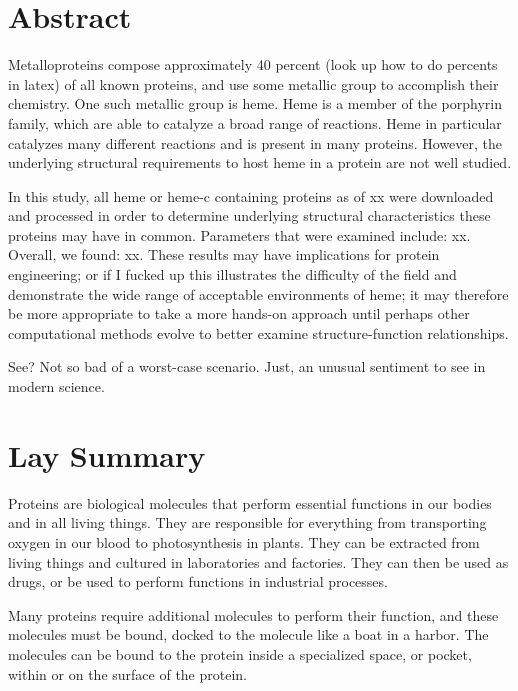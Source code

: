 \documentclass[12pt,oneside,a4paper]{report}
\begin{document}
	
	
	\chapter*{Abstract}
	
	
		Metalloproteins compose approximately 40 percent (look up how to do percents in latex) of all known proteins, and use some metallic group to accomplish their chemistry. One such metallic group is heme. Heme is a member of the porphyrin family, which are able to catalyze a broad range of reactions. Heme in particular catalyzes many different reactions and is present in many proteins. However, the underlying structural requirements to host heme in a protein are not well studied.
		
		In this study, all heme or heme-c containing proteins as of xx were downloaded and processed in order to determine underlying structural characteristics these proteins may have in common. Parameters that were examined include: xx. Overall, we found: xx. These results may have implications for protein engineering; or if I fucked up this illustrates the difficulty of the field and demonstrate the wide range of acceptable environments of heme; it may therefore be more appropriate to take a more hands-on approach until perhaps other computational methods evolve to better examine structure-function relationships.
		
		See? Not so bad of a worst-case scenario. Just, an unusual sentiment to see in modern science.
		
	
	\chapter*{Lay Summary}
		
		Proteins are biological molecules that perform essential functions in our bodies and in all living things. They are responsible for everything from transporting oxygen in our blood to photosynthesis in plants. They can be extracted from living things and cultured in laboratories and factories. They can then be used as drugs, or be used to perform functions in industrial processes.
		
		Many proteins require additional molecules to perform their function, and these molecules must be bound, docked to the molecule like a boat in a harbor. The molecules can be bound to the protein inside a specialized space, or pocket, within or on the surface of the protein.
		
\end{document}
